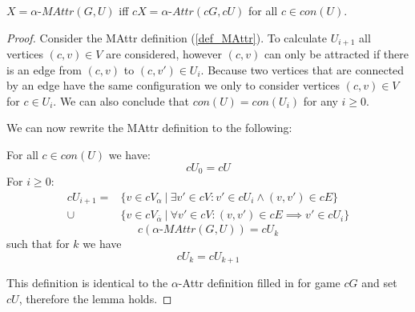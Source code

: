 \begin{lemma}
	\label{lem_MPG_MAttr_is_Attr}
	$X = \alpha\textit{-MAttr}(G,U)$ iff $cX = \alpha\textit{-Attr}(cG, cU)$ for all $c \in con(U)$.
	\begin{proof}
		Consider the MAttr definition (\ref{def_MAttr}). To calculate $U_{i+1}$ all vertices $(c,v) \in V$ are considered, however $(c,v)$ can only be attracted if there is an edge from $(c,v)$ to $(c,v') \in U_i$. Because two vertices that are connected by an edge have the same configuration we only to consider vertices $(c,v) \in V$ for $c \in U_i$. We can also conclude that $con(U) = con(U_i)$ for any $i \geq 0$.
		
		We can now rewrite the MAttr definition to the following:
		
		For all $c \in con(U)$ we have:
		\[ cU_0 = cU \]
		For $i \geq 0$:
		\begin{align*}
		cU_{i+1} = &\{v \in cV_\alpha\ |\ \exists v' \in cV : v' \in cU_i \wedge (v,v') \in cE \}\\
		\cup &\{v \in cV_{\overline{\alpha}}\ |\ \forall v' \in cV :(v,v') \in cE \implies v' \in cU_i \}
		\end{align*}
		\[ c(\alpha\textit{-MAttr}(G,U)) = cU_k \]
		such that for $k$ we have
		\[ cU_k = cU_{k+1} \]
		
		This definition is identical to the $\alpha$-Attr definition filled in for game $cG$ and set $cU$, therefore the lemma holds.
	\end{proof}
\end{lemma}

